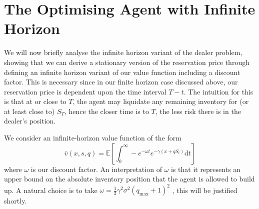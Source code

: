 \section{The Optimising Agent with Infinite Horizon}\label{sec:3.4}
We will now briefly analyse the infinite horizon variant of the dealer problem, showing
that we can derive a stationary version of the reservation price through defining
an infinite horizon variant of our value function including a discount factor. This is
necessary since in our finite horizon case discussed above, our reservation price is
dependent upon the time interval $T-t.$ The intuition for this is that at or close to 
$T$, the agent may liquidate any remaining inventory for (or at least close to) $S_T$,
hence the closer time is to $T$, the less risk there is in the dealer's position.

We consider an infinite-horizon value function of the form
\begin{equation*}
    \bar v(x,s,q)=\mathbb{E}\left[\int_{0}^{\infty}-e^{-\omega t}e^{-\gamma(x+qS_t)}\mathrm dt\right]
\end{equation*}
where $\omega$ is our discount factor. An interpretation of $\omega$ is that it
represents an upper bound on the absolute inventory position that the agent is allowed
to build up. A natural choice is to take $\omega=\frac{1}{2}\gamma^2\sigma^2(q_{\textrm{max}}+1)^2$
, this will be justified shortly. 

